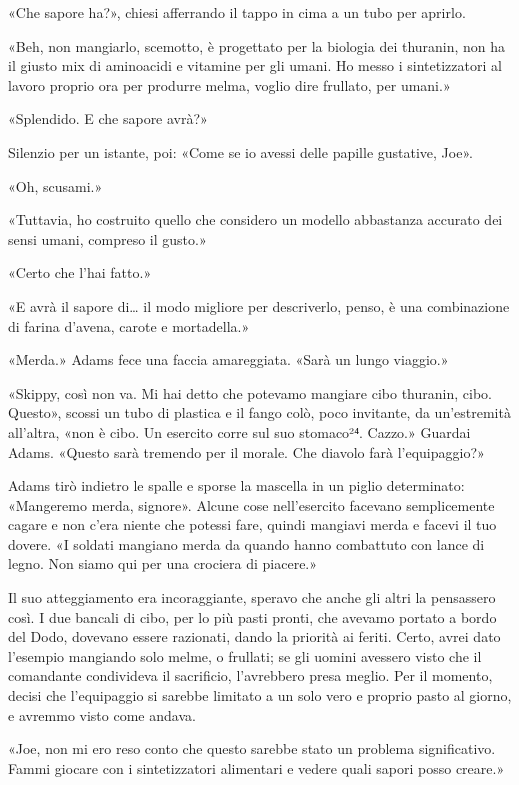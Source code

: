 «Che sapore ha?», chiesi afferrando il tappo in cima a un tubo per
aprirlo.

«Beh, non mangiarlo, scemotto, è progettato per la biologia dei
thuranin, non ha il giusto mix di aminoacidi e vitamine per gli umani.
Ho messo i sintetizzatori al lavoro proprio ora per produrre melma,
voglio dire frullato, per umani.»

«Splendido. E che sapore avrà?»

Silenzio per un istante, poi: «Come se io avessi delle papille
gustative, Joe».

«Oh, scusami.»

«Tuttavia, ho costruito quello che considero un modello abbastanza
accurato dei sensi umani, compreso il gusto.»

«Certo che l'hai fatto.»

«E avrà il sapore di\ldots{} il modo migliore per descriverlo, penso, è
una combinazione di farina d'avena, carote e mortadella.»

«Merda.» Adams fece una faccia amareggiata. «Sarà un lungo viaggio.»

«Skippy, così non va. Mi hai detto che potevamo mangiare cibo thuranin,
cibo. Questo», scossi un tubo di plastica e il fango colò, poco
invitante, da un'estremità all'altra, «non è cibo. Un esercito corre sul
suo stomaco²⁴. Cazzo.» Guardai Adams. «Questo sarà tremendo per il
morale. Che diavolo farà l'equipaggio?»

Adams tirò indietro le spalle e sporse la mascella in un piglio
determinato: «Mangeremo merda, signore». Alcune cose nell'esercito
facevano semplicemente cagare e non c'era niente che potessi fare,
quindi mangiavi merda e facevi il tuo dovere. «I soldati mangiano merda
da quando hanno combattuto con lance di legno. Non siamo qui per una
crociera di piacere.»

Il suo atteggiamento era incoraggiante, speravo che anche gli altri la
pensassero così. I due bancali di cibo, per lo più pasti pronti, che
avevamo portato a bordo del Dodo, dovevano essere razionati, dando la
priorità ai feriti. Certo, avrei dato l'esempio mangiando solo melme, o
frullati; se gli uomini avessero visto che il comandante condivideva il
sacrificio, l'avrebbero presa meglio. Per il momento, decisi che
l'equipaggio si sarebbe limitato a un solo vero e proprio pasto al
giorno, e avremmo visto come andava.

«Joe, non mi ero reso conto che questo sarebbe stato un problema
significativo. Fammi giocare con i sintetizzatori alimentari e vedere
quali sapori posso creare.»

